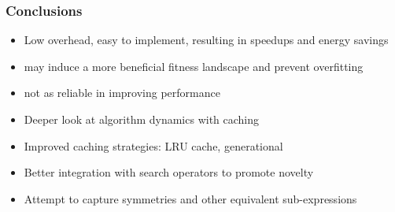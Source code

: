 \documentclass[lualatex,professionalfonts,aspectratio=169,usepdftitle=false,xcolor={dvipsnames}]{beamer}
\begin{document}
\begin{frame}
    \frametitle{Conclusions}


    \begin{itemize}
        \item Low overhead, easy to implement, resulting in speedups and energy savings
        \item {} may induce a more beneficial fitness landscape and prevent overfitting
        \item {} not as reliable in improving performance
    \end{itemize}
    \bigskip

    \begin{itemize}
        \item Deeper look at algorithm dynamics with caching
        \item Improved caching strategies: LRU cache, generational
        \item Better integration with search operators to promote novelty
        \item Attempt to capture symmetries and other equivalent sub-expressions
    \end{itemize}
\end{frame}




\end{document}
